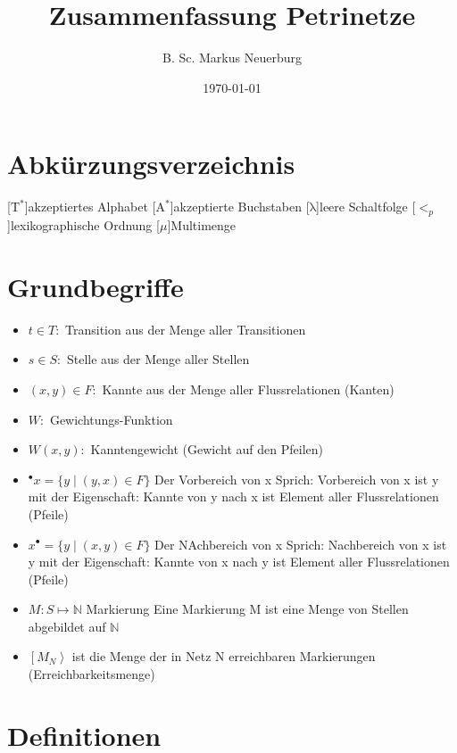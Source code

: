 \documentclass[12pt]{scrreprt}
\title{Zusammenfassung Petrinetze}
\author{B. Sc. Markus Neuerburg}
\date{\today}
\begin{document}
\setlength{\topmargin}{0cm}
\parindent 0pt
\onehalfspacing

\tableofcontents
\newpage
\chapter*{Abkürzungsverzeichnis}
\begin{acronym}[HBCI]
	[$\mathrm{T^*}$]{akzeptiertes Alphabet}
	[$\mathrm{A^*}$]{akzeptierte Buchstaben}
	[$\mathrm{\lambda}$]{leere Schaltfolge}
	[$<_p$]{lexikographische Ordnung}
	[$\mu$]{Multimenge}
\end{acronym}

\chapter{Grundbegriffe}
\begin{itemize}
	\item $t \in T:$						\tabto{4cm} Transition aus der Menge aller Transitionen
	\item $s \in S:$						\tabto{4cm} Stelle aus der Menge aller Stellen
	\item $(x, y) \in F:$					\tabto{4cm} Kannte aus der Menge aller Flussrelationen (Kanten)
	\item $W:$								\tabto{4cm} Gewichtungs-Funktion
	\item $W(x, y):$						\tabto{4cm} Kanntengewicht (Gewicht auf den Pfeilen)
	\item $^\bullet x=\{y \mid (y,x) \in F \}$	\tabto{4cm} Der Vorbereich von x\newline
	Sprich: Vorbereich von x ist y mit der Eigenschaft: Kannte von y nach x ist Element aller Flussrelationen (Pfeile)
	\item $x^\bullet =\{y \mid (x, y) \in F\}$	\tabto{4cm} Der NAchbereich von x\newline
	Sprich: Nachbereich von x ist y mit der Eigenschaft: Kannte von x nach y ist Element aller Flussrelationen (Pfeile)
	\item $M:S\mapsto \mathbb{N}$			\tabto{4cm} Markierung\newline
	Eine Markierung M ist eine Menge von Stellen abgebildet auf $\mathbb{N}$
	\item $\left[ M_N \right>$ ist die Menge der in Netz N erreichbaren Markierungen (Erreichbarkeitsmenge)
\end{itemize}

\chapter{Definitionen}
\end{document}
